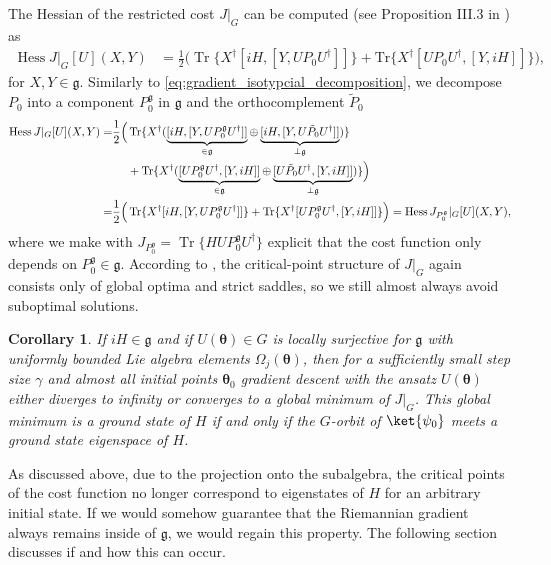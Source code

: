 \documentclass{article}
\renewcommand{\vec}[1]{\ensuremath{\boldsymbol{#1}}}
\newtheorem{corollary}{Corollary}
\begin{document}
The Hessian of the restricted cost \(J\vert_G\) can be computed (see Proposition III.3 in \cite{schulte2010gradient}) as
\begin{align}
\operatorname{Hess}J\vert_G[U](X,Y) &= \frac{1}{2}\Big(\operatorname{Tr}\{X^\dagger[iH,[Y,UP_0U^\dagger]]\} + \mathrm{Tr}\{X^\dagger[UP_0U^\dagger,[Y,iH]]\}\Big),
\end{align}
for $X,Y\in\mathfrak g$.
Similarly to \cref{eq:gradient_isotypcial_decomposition}, we decompose \(P_0\) into a component \(P_0^\mathfrak{g}\) in \(\mathfrak{g}\) and the orthocomplement \(\tilde{P}_0\)
\begin{align}
    \operatorname{Hess}J\vert_G[U](X,Y) = & \frac{1}{2} \Big( \operatorname{Tr} \{X^\dagger (\underbrace{[iH, [Y, U P_0^\mathfrak{g} U^\dagger]]}_{\in \mathfrak{g}} \oplus \underbrace{[iH, [Y, U \tilde{P}_0 U^\dagger]]}_{\perp \mathfrak{g}})\} \nonumber \\
    & \hphantom{\frac{1}{2} \Big(} + \operatorname{Tr} \{X^\dagger (\underbrace{[U P_0^\mathfrak{g} U^\dagger, [Y, iH]]}_{\in \mathfrak{g}} \oplus \underbrace{[U \tilde{P}_0 U^\dagger, [Y, iH]]}_{\perp \mathfrak{g}})\} \Big)  \\
    = & \frac{1}{2} \Big(\operatorname{Tr}\{X^\dagger[iH,[Y,UP_0^\mathfrak{g}U^\dagger]]\} + \mathrm{Tr}\{X^\dagger[UP_0^\mathfrak{g}U^\dagger,[Y,iH]]\}\Big) = \operatorname{Hess}J_{P_0^\mathfrak{g}}\vert_G[U](X,Y), \nonumber 
\end{align}
where we make with \(J_{P_0^\mathfrak{g}} = \operatorname{Tr}\{H U P_0^\mathfrak{g} U^\dagger\}\) explicit that the cost function only depends on \(P_0^\mathfrak{g} \in \mathfrak{g}\).
According to , the critical-point structure of $J\vert_G$ again consists only of global optima and strict saddles, so we still almost always avoid suboptimal solutions.

\begin{corollary}
    If $iH\in\mathfrak g$ and if $U(\vec{\theta})\in G$ is locally surjective for $\mathfrak g$ with uniformly bounded Lie algebra elements $\Omega_j(\vec{\theta})$, then for a sufficiently small step size $\gamma$ and almost all initial points $\vec{\theta}_0$ gradient descent with the ansatz $U(\vec{\theta})$ either diverges to infinity or converges to a global minimum of $J\vert_G$. This global minimum is a ground state of $H$ if and only if the $G$-orbit of $\ket{\psi_0}$ meets a ground state eigenspace of $H$.
\end{corollary}

As discussed above, due to the projection onto the subalgebra, the critical points of the cost function no longer correspond to eigenstates of \(H\) for an arbitrary initial state.
If we would somehow guarantee that the Riemannian gradient always remains inside of \(\mathfrak{g}\), we would regain this property.
The following section discusses if and how this can occur.
\end{document}
